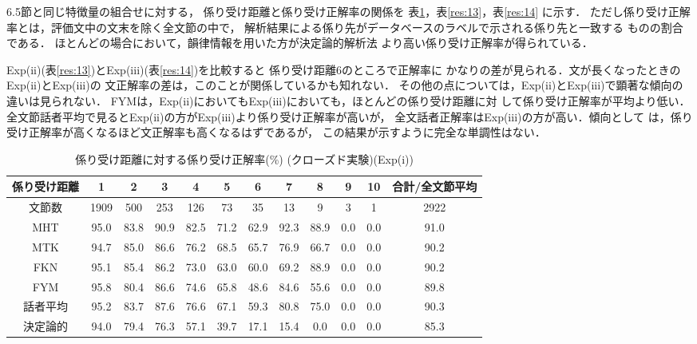 6.5節と同じ特徴量の組合せに対する，
係り受け距離と係り受け正解率の関係を
表\ref{res:12}，表\ref{res:13}，表\ref{res:14} に示す．
ただし係り受け正解率とは，評価文中の文末を除く全文節の中で，
解析結果による係り先がデータベースのラベルで示される係り先と一致する
ものの割合である．
ほとんどの場合において，韻律情報を用いた方が決定論的解析法
より高い係り受け正解率が得られている．

Exp(ii)(表\ref{res:13})とExp(iii)(表\ref{res:14})を比較すると
係り受け距離6のところで正解率に
かなりの差が見られる．文が長くなったときのExp(ii)とExp(iii)の
文正解率の差は，このことが関係しているかも知れない．
その他の点については，Exp(ii)とExp(iii)で顕著な傾向の違いは見られない．
FYMは，Exp(ii)においてもExp(iii)においても，ほとんどの係り受け距離に対
して係り受け正解率が平均より低い．
全文節話者平均で見るとExp(ii)の方がExp(iii)より係り受け正解率が高いが，
全文話者正解率はExp(iii)の方が高い．傾向として
は，係り受け正解率が高くなるほど文正解率も高くなるはずであるが，
この結果が示すように完全な単調性はない．

\begin{table}
\begin{center}
\caption{係り受け距離に対する係り受け正解率(\%) (クローズド実験)(Exp(i))}
\label{res:12}
\footnotesize
\begin{tabular}{|c|c|c|c|c|c|c|c|c|c|c||c|}
\hline
係り受け距離		&1&2&3&4&5&6&7&8&9&10&合計/全文節平均\\
\hline
\hline
文節数		&1909&500&253&126&73&35&13&9&3&1&2922\\
\hline
MHT		&95.0&83.8&90.9&82.5&71.2&62.9&92.3&88.9&0.0&0.0&91.0\\
MTK		&94.7&85.0&86.6&76.2&68.5&65.7&76.9&66.7&0.0&0.0&90.2\\
FKN		&95.1&85.4&86.2&73.0&63.0&60.0&69.2&88.9&0.0&0.0&90.2\\
FYM		&95.8&80.4&86.6&74.6&65.8&48.6&84.6&55.6&0.0&0.0&89.8\\
話者平均            &95.2&83.7&87.6&76.6&67.1&59.3&80.8&75.0&0.0&0.0&90.3\\
\hline
決定論的	&94.0&79.4&76.3&57.1&39.7&17.1&15.4&0.0&0.0&0.0&85.3\\
\hline
\end{tabular}
\normalsize
\end{center}
\end{table}

